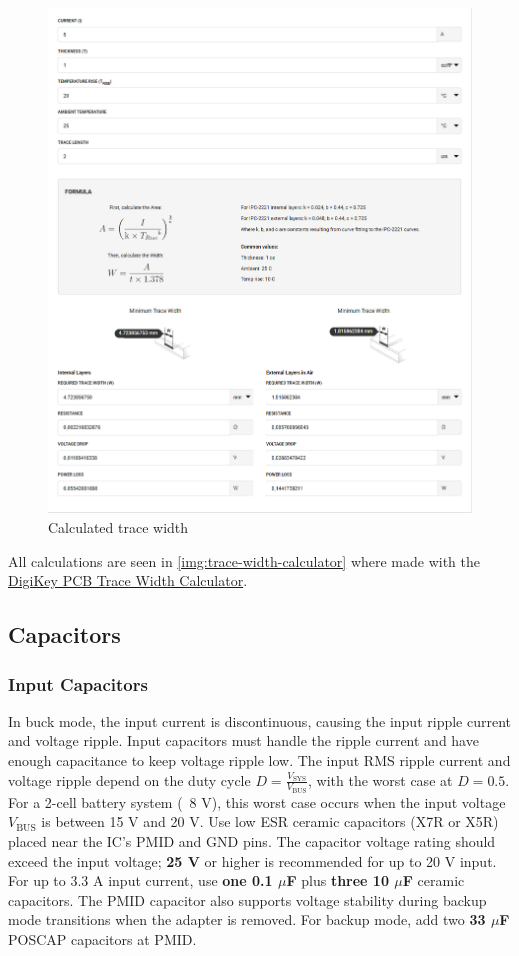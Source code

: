 \documentclass[12pt]{article}
\begin{document}
\begin{figure}[H]
    \centering
    \includegraphics[width=.6\linewidth]{trace width calc.PNG}
    \caption{Calculated trace width}
    \label{img:trace-width-calculator}
\end{figure}

All calculations are seen in \autoref{img:trace-width-calculator} where made with the \href{https://www.digikey.com/en/resources/conversion-calculators/conversion-calculator-pcb-trace-width}{DigiKey PCB Trace Width Calculator}.

\subsection{Capacitors}
\subsubsection{Input Capacitors}
In buck mode, the input current is discontinuous, causing the input ripple current and voltage ripple. Input capacitors must handle the ripple current and have enough capacitance to keep voltage ripple low. The input RMS ripple current and voltage ripple depend on the duty cycle \( D = \frac{V_{\text{SYS}}}{V_{\text{BUS}}} \), with the worst case at \( D = 0.5 \). For a 2-cell battery system (~8 V), this worst case occurs when the input voltage \( V_{\text{BUS}} \) is between 15 V and 20 V.
Use low ESR ceramic capacitors (X7R or X5R) placed near the IC's PMID and GND pins. The capacitor voltage rating should exceed the input voltage; \textbf{25 V} or higher is recommended for up to 20 V input. For up to 3.3 A input current, use \textbf{one 0.1 \(\mu\)F} plus \textbf{three 10 \(\mu\)F} ceramic capacitors.
The PMID capacitor also supports voltage stability during backup mode transitions when the adapter is removed. For backup mode, add two \textbf{33 \(\mu\)F} POSCAP capacitors at PMID.
\end{document}
